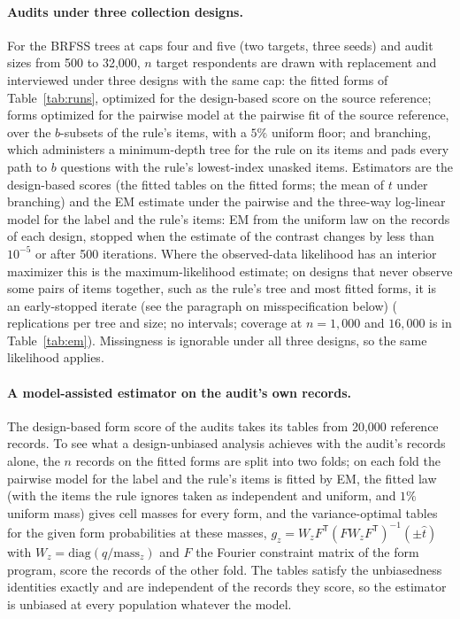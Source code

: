 \paragraph{Audits under three collection designs.}
For the BRFSS trees at caps four and five (two targets, three seeds) and audit sizes from 500 to 32,000, $n$ target respondents are drawn with replacement and interviewed under three designs with the same cap: the fitted forms of Table~\ref{tab:runs}, optimized for the design-based score on the source reference; forms optimized for the pairwise model at the pairwise fit of the source reference, over the $b$-subsets of the rule's items, with a $5\%$ uniform floor; and branching, which administers a minimum-depth tree for the rule on its items and pads every path to $b$ questions with the rule's lowest-index unasked items. Estimators are the design-based scores (the fitted tables on the fitted forms; the mean of $t$ under branching) and the EM estimate under the pairwise and the three-way log-linear model for the label and the rule's items: EM from the uniform law on the records of each design, stopped when the estimate of the contrast changes by less than $10^{-5}$ or after 500 iterations. Where the observed-data likelihood has an interior maximizer this is the maximum-likelihood estimate; on designs that never observe some pairs of items together, such as the rule's tree and most fitted forms, it is an early-stopped iterate (see the paragraph on misspecification below) (\nCurveReps{} replications per tree and size; no intervals; coverage at $n=1{,}000$ and $16{,}000$ is in Table~\ref{tab:em}). Missingness is ignorable under all three designs, so the same likelihood applies.

\nAuditAppendixText

\paragraph{A model-assisted estimator on the audit's own records.}
The design-based form score of the audits takes its tables from 20,000 reference records. To see what a design-unbiased analysis achieves with the audit's records alone, the $n$ records on the fitted forms are split into two folds; on each fold the pairwise model for the label and the rule's items is fitted by EM, the fitted law (with the items the rule ignores taken as independent and uniform, and $1\%$ uniform mass) gives cell masses for every form, and the variance-optimal tables for the given form probabilities at these masses, $g_z=W_zF^{\mathsf T}(FW_zF^{\mathsf T})^{-1}(\pm\hat t)$ with $W_z=\mathrm{diag}(q/\text{mass}_z)$ and $F$ the Fourier constraint matrix of the form program, score the records of the other fold. The tables satisfy the unbiasedness identities exactly and are independent of the records they score, so the estimator is unbiased at every population whatever the model.

\nAipwAppendixText

